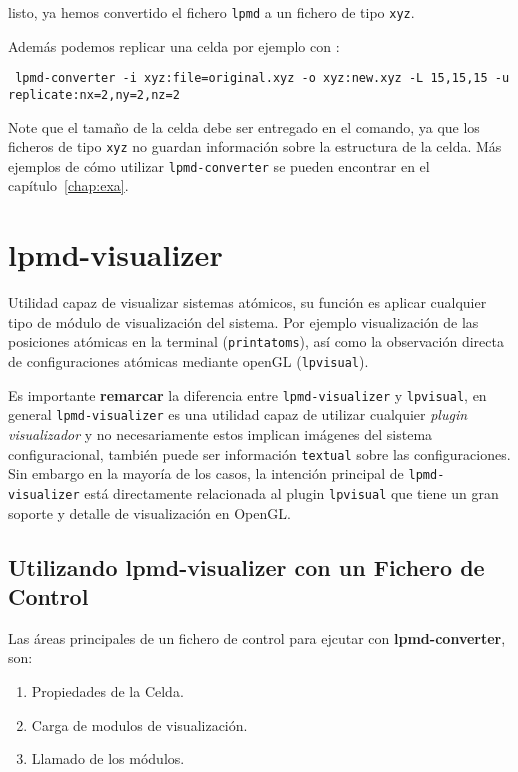 \noindent
listo, ya hemos convertido el fichero \verb|lpmd| a un fichero de tipo \verb|xyz|.

Adem\'as podemos replicar una celda por ejemplo con :

\begin{verbatim}
 lpmd-converter -i xyz:file=original.xyz -o xyz:new.xyz -L 15,15,15 -u replicate:nx=2,ny=2,nz=2
\end{verbatim}

Note que el tamaño de la celda debe ser entregado en el comando, ya que los ficheros de tipo \verb|xyz| no guardan informaci\'on sobre la estructura de la celda. M\'as ejemplos de c\'omo utilizar \verb|lpmd-converter| se pueden encontrar en el cap\'itulo~\ref{chap:exa}.

\section{lpmd-visualizer}
Utilidad capaz de visualizar sistemas at\'omicos, su funci\'on es aplicar cualquier tipo de m\'odulo de visualizaci\'on del sistema. Por ejemplo visualizaci\'on de las posiciones at\'omicas en la terminal (\verb|printatoms|), as\'i como la observaci\'on directa de configuraciones at\'omicas mediante openGL (\verb|lpvisual|). 

Es importante \textbf{remarcar} la diferencia entre \verb|lpmd-visualizer| y \verb|lpvisual|, en general \verb|lpmd-visualizer| es una utilidad capaz de utilizar cualquier \textit{plugin visualizador} y no necesariamente estos implican im\'agenes del sistema configuracional, tambi\'en puede ser informaci\'on \verb|textual| sobre las configuraciones. Sin embargo en la mayor\'ia de los casos, la intenci\'on principal de \verb|lpmd-visualizer| est\'a directamente relacionada al plugin \verb|lpvisual| que tiene un gran soporte y detalle de visualizaci\'on en OpenGL.

\subsection{Utilizando lpmd-visualizer con un Fichero de Control}

Las \'areas principales de un fichero de control para ejcutar con \textbf{lpmd-converter}, son:

\begin{enumerate}
 \item Propiedades de la Celda.
 \item Carga de modulos de visualizaci\'on.
 \item Llamado de los m\'odulos.
\end{enumerate}

